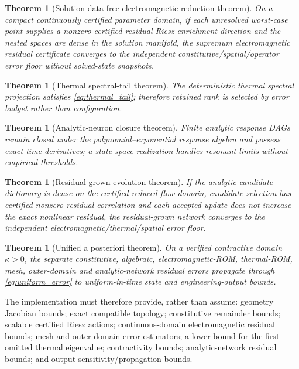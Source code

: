 \documentclass[11pt]{article}
\newtheorem{theorem}[assumption]{Theorem}
\theoremstyle{remark}
\begin{document}
\begin{theorem}[Solution-data-free electromagnetic reduction theorem]
On a compact continuously certified parameter domain, if each unresolved worst-case point supplies a nonzero certified residual-Riesz enrichment direction and the nested spaces are dense in the solution manifold, the supremum electromagnetic residual certificate converges to the independent constitutive/spatial/operator error floor without solved-state snapshots.
\end{theorem}

\begin{theorem}[Thermal spectral-tail theorem]
The deterministic thermal spectral projection satisfies \eqref{eq:thermal_tail}; therefore retained rank is selected by error budget rather than configuration.
\end{theorem}

\begin{theorem}[Analytic-neuron closure theorem]
Finite analytic response DAGs remain closed under the polynomial--exponential response algebra and possess exact time derivatives; a state-space realization handles resonant limits without empirical thresholds.
\end{theorem}

\begin{theorem}[Residual-grown evolution theorem]
If the analytic candidate dictionary is dense on the certified reduced-flow domain, candidate selection has certified nonzero residual correlation and each accepted update does not increase the exact nonlinear residual, the residual-grown network converges to the independent electromagnetic/thermal/spatial error floor.
\end{theorem}

\begin{theorem}[Unified a posteriori theorem]
On a verified contractive domain \(\kappa>0\), the separate constitutive, algebraic, electromagnetic-ROM, thermal-ROM, mesh, outer-domain and analytic-network residual errors propagate through \eqref{eq:uniform_error} to uniform-in-time state and engineering-output bounds.
\end{theorem}

The implementation must therefore provide, rather than assume: geometry Jacobian bounds; exact compatible topology; constitutive remainder bounds; scalable certified Riesz actions; continuous-domain electromagnetic residual bounds; mesh and outer-domain error estimators; a lower bound for the first omitted thermal eigenvalue; contractivity bounds; analytic-network residual bounds; and output sensitivity/propagation bounds.
\end{document}
